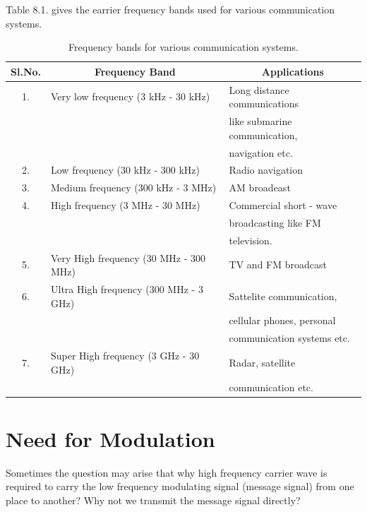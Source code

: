 Table 8.1.  gives the earrier frequency bands used for various
communication systems. 

\begin{table}[H]
\caption{Frequency bands for various communication systems.}\label{tab8.1}
\begin{tabular}{c|l|l}
\hline
{\bf Sl.No.} & \multicolumn{1}{c|}{\bf Frequency Band} & \multicolumn{1}{c}{\bf Applications}\\
\hline
1. & Very low frequency (3 kHz - 30 kHz) & Long distance
communications\\[-0.1cm]
& & like submarine communication,\\[-0.1cm]
& & navigation etc.\\[0.2cm]
2. & Low frequency (30 kHz - 300 kHz) & Radio navigation \\[0.2cm]
3. & Medium frequency  (300 kHz - 3 MHz) & AM broadeast\\[0.2cm]
4. & High frequency (3 MHz - 30 MHz) & Commercial short - wave\\[-0.1cm]
& & broadcasting like FM\\[-0.1cm]
& & television. \\[0.2cm]
5. & Very High frequency (30 MHz - 300 MHz) & TV and FM broadcast\\[0.2cm]
6. & Ultra High frequency (300 MHz - 3 GHz) & Sattelite
communication, \\[-0.1cm]
& & cellular phones, personal\\[-0.1cm]
& & communication systems etc.\\[0.2cm]
7. & Super High frequency (3 GHz - 30 GHz) & Radar, satellite \\[-0.1cm]
& & communication etc.\\
\hline
\end{tabular}
\end{table}

\section{Need for Modulation}\label{sec8.4}

Sometimes the question may arise that why high frequency carrier wave
is required to carry the low frequency modulating signal (message
signal) from one place to another? Why not we transmit the message
signal directly?

